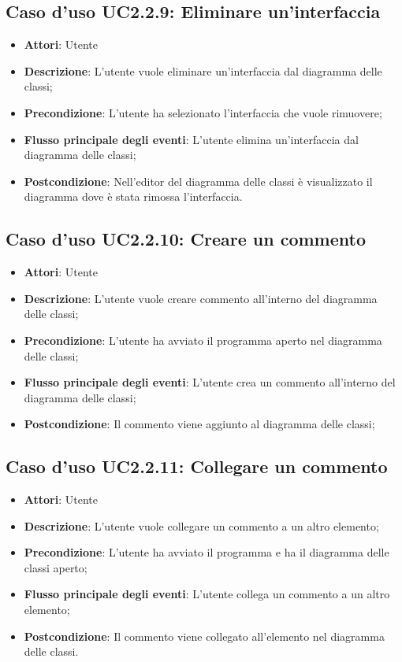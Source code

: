 \documentclass[../AnalisiDeiRequisiti.tex]{subfiles}
\begin{document}
			\subsection{Caso d'uso UC2.2.9: Eliminare un'interfaccia}
			\begin{itemize}
				\item \textbf{Attori}: Utente
				\item \textbf{Descrizione}: L'utente vuole eliminare un'interfaccia dal diagramma delle classi;
				\item \textbf{Precondizione}: L'utente ha selezionato l'interfaccia che vuole rimuovere;
				\item \textbf{Flusso principale degli eventi}: L'utente elimina un'interfaccia dal diagramma delle classi;
				\item \textbf{Postcondizione}: Nell'editor del diagramma delle classi è visualizzato il diagramma dove è stata rimossa l'interfaccia.
			\end{itemize}
			\subsection{Caso d'uso UC2.2.10: Creare un commento}
			\begin{itemize}
				\item \textbf{Attori}: Utente
				\item \textbf{Descrizione}: L'utente vuole creare commento all'interno del diagramma delle classi;
				\item \textbf{Precondizione}: L'utente ha avviato il programma aperto nel diagramma delle classi;
				\item \textbf{Flusso principale degli eventi}: L'utente crea un commento all'interno del diagramma delle classi;
				\item \textbf{Postcondizione}: Il commento viene aggiunto al diagramma delle classi;
			\end{itemize}
			\subsection{Caso d'uso UC2.2.11: Collegare un commento}
			\begin{itemize}
				\item \textbf{Attori}: Utente
				\item \textbf{Descrizione}: L'utente vuole collegare un commento a un altro elemento;
				\item \textbf{Precondizione}: L'utente ha avviato il programma e ha il diagramma delle classi aperto;
				\item \textbf{Flusso principale degli eventi}: L'utente collega un commento a un altro elemento;
				\item \textbf{Postcondizione}: Il commento viene collegato all'elemento nel diagramma delle classi.
			\end{itemize}
\end{document}
